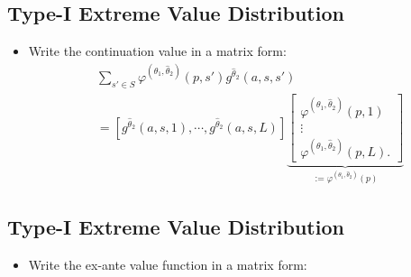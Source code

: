 \documentclass[
]{book}
\providecommand{\tightlist}{%
  \setlength{\itemsep}{0pt}\setlength{\parskip}{0pt}}
\begin{document}
\hypertarget{type-i-extreme-value-distribution-3}{%
\subsection{Type-I Extreme Value Distribution}\label{type-i-extreme-value-distribution-3}}

\begin{itemize}
\tightlist
\item
  Write the continuation value in a matrix form:
  \begin{equation}
  \begin{split}
  & \sum_{s' \in S} \varphi^{(\theta_1, \hat{\theta}_2)}(p, s') g^{\hat{\theta}_2}(a, s, s')\\
  & = [g^{\hat{\theta}_2}(a, s, 1), \cdots, g^{\hat{\theta}_2}(a, s, L)] 
  \underbrace{\begin{bmatrix}
  \varphi^{(\theta_1, \hat{\theta}_2)}(p, 1)\\
  \vdots\\
  \varphi^{(\theta_1, \hat{\theta}_2)}(p, L).
  \end{bmatrix}}_{:= \varphi^{(\theta_1, \hat{\theta}_2)}(p)}
  \end{split}
  \end{equation}
\end{itemize}

\hypertarget{type-i-extreme-value-distribution-4}{%
\subsection{Type-I Extreme Value Distribution}\label{type-i-extreme-value-distribution-4}}

\begin{itemize}
\tightlist
\item
  Write the ex-ante value function in a matrix form:
\end{itemize}
\end{document}
